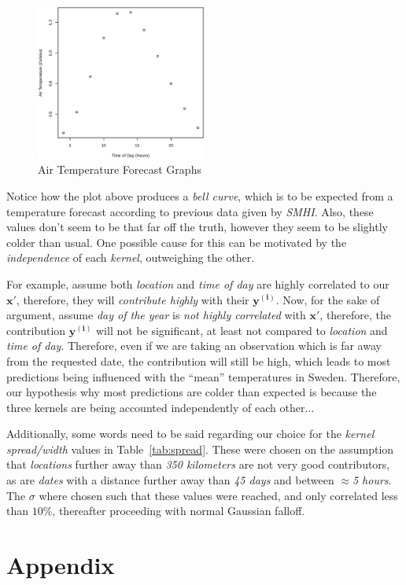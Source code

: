 \documentclass[a4paper, twocolumn]{article}
\begin{document}
    \begin{figure}[h!]
        \centering
        \caption{Air Temperature Forecast Graphs}
        \label{fig:forecast}
        \includegraphics[width=0.5\textwidth]{share/forecast.eps}
    \end{figure}

    Notice how the plot above produces a \emph{bell curve}, which is to be expected from a temperature forecast according to previous data given by \emph{SMHI}. Also, these values don't seem to be that far off the truth, however they seem to be slightly colder than usual. One possible cause for this can be motivated by the \emph{independence} of each \emph{kernel}, outweighing the other.

    For example, assume both \emph{location} and \emph{time of day} are highly correlated to our $\bm{x'}$, therefore, they will \emph{contribute highly} with their $\bm{y^{(i)}}$. Now, for the sake of argument, assume \emph{day of the year} is \emph{not highly correlated} with $\bm{x'}$, therefore, the contribution $\bm{y^{(i)}}$ will not be significant, at least not compared to \emph{location} and \emph{time of day}. Therefore, even if we are taking an observation which is far away from the requested date, the contribution will still be high, which leads to most predictions being influenced with the ``mean'' temperatures in Sweden. Therefore, our hypothesis why most predictions are colder than expected is because the three kernels are being accounted independently of each other...

    Additionally, some words need to be said regarding our choice for the \emph{kernel spread/width} values in Table~\ref{tab:spread}. These were chosen on the assumption that \emph{locations} further away than \emph{350 kilometers} are not very good contributors, as are \emph{dates} with a distance further away than \emph{45 days} and between \emph{$\approx$5 hours}. The $\sigma$ where chosen such that these values were reached, and only correlated less than $10 \%$, thereafter proceeding with normal Gaussian falloff.

    \nocite{*}
    
    

    \onecolumn \appendix
    \section*{Appendix}

    
\end{document}
